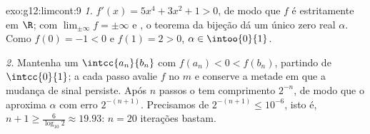 \begin{solution}{exo:g12:limcont:9}
\emph{1.} $f'(x) = 5x^4 + 3x^2 + 1 > 0$, de modo que $f$ é estritamente
 em $\R$; com $\lim_{\pm\infty} f = \pm\infty$ e , o
teorema da bijeção dá um único zero real $\alpha$. Como $f(0) = -1 < 0$ e
$f(1) = 2 > 0$, $\alpha \in \intoo{0}{1}$.

\emph{2.} Mantenha um  $\intcc{a_n}{b_n}$ com
$f(a_n) < 0 < f(b_n)$, partindo de $\intcc{0}{1}$; a cada passo avalie $f$
no  $m$ e conserve a metade em que a mudança de sinal persiste.
Após $n$ passos o  tem comprimento $2^{-n}$, de modo que o  aproxima $\alpha$ com erro $2^{-(n+1)}$. Precisamos de
$2^{-(n+1)} \leq 10^{-6}$, isto é,
$n + 1 \geq \frac{6}{\log_{10} 2} \approx 19.93$: $n = 20$ iterações
bastam.
\end{solution}

